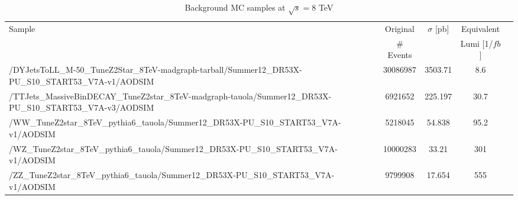 \documentclass[12pt]{article}
\begin{document}
\begin{table}[h]
\begin{center}
\caption{\label{tab:BGSamples8TeV} Background MC samples at $\sqrt{s}=8$ TeV}
\begin{tabular}{|p{10cm}|c|c|c|c|} \hline
Sample & Original  & $\sigma$ [pb] & Equivalent \\
 &  \# Events &  &  Lumi [1/$fb$] \\
\hline
\hline
/DYJetsToLL\_M-50\_TuneZ2Star\_8TeV-madgraph-tarball/Summer12\_DR53X-PU\_S10\_START53\_V7A-v1/AODSIM &	     30086987 &	  3503.71 &   8.6  \\
\hline                                                                                                                                     
/TTJets\_MassiveBinDECAY\_TuneZ2star\_8TeV-madgraph-tauola/Summer12\_DR53X-PU\_S10\_START53\_V7A-v3/AODSIM &  6921652 &	  225.197 &  30.7  \\
\hline                                                                                                                                     
/WW\_TuneZ2star\_8TeV\_pythia6\_tauola/Summer12\_DR53X-PU\_S10\_START53\_V7A-v1/AODSIM & 	              5218045 &	   54.838 &  95.2  \\
\hline                                                                                                                                     
/WZ\_TuneZ2star\_8TeV\_pythia6\_tauola/Summer12\_DR53X-PU\_S10\_START53\_V7A-v1/AODSIM &	             10000283 &	    33.21 & 301    \\
\hline                                                                                                                                     
/ZZ\_TuneZ2star\_8TeV\_pythia6\_tauola/Summer12\_DR53X-PU\_S10\_START53\_V7A-v1/AODSIM 	&  	              9799908 &    17.654 & 555	   \\
\hline
\end{tabular}
\end{center}
\end{table}
\end{document}
